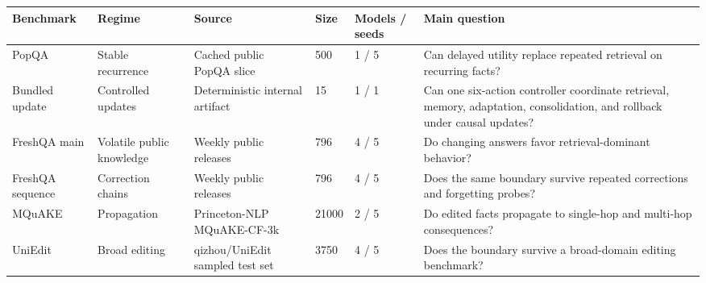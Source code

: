 \begin{tabular}{p{1.6cm}p{1.6cm}p{1.8cm}p{1.0cm}p{1.4cm}p{3.5cm}}
\toprule
Benchmark & Regime & Source & Size & Models / seeds & Main question \\
\midrule
PopQA & Stable recurrence & Cached public PopQA slice & 500 & 1 / 5 & Can delayed utility replace repeated retrieval on recurring facts? \\
Bundled update & Controlled updates & Deterministic internal artifact & 15 & 1 / 1 & Can one six-action controller coordinate retrieval, memory, adaptation, consolidation, and rollback under causal updates? \\
FreshQA main & Volatile public knowledge & Weekly public releases & 796 & 4 / 5 & Do changing answers favor retrieval-dominant behavior? \\
FreshQA sequence & Correction chains & Weekly public releases & 796 & 4 / 5 & Does the same boundary survive repeated corrections and forgetting probes? \\
MQuAKE & Propagation & Princeton-NLP MQuAKE-CF-3k & 21000 & 2 / 5 & Do edited facts propagate to single-hop and multi-hop consequences? \\
UniEdit & Broad editing & qizhou/UniEdit sampled test set & 3750 & 4 / 5 & Does the boundary survive a broad-domain editing benchmark? \\
\bottomrule
\end{tabular}
